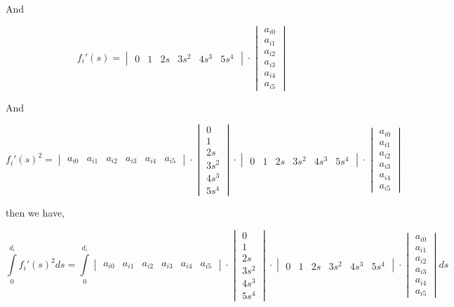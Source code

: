 \documentclass[a4paper,11pt]{article}  %
\begin{document}
And

$$
f_i'(s) =
\begin{vmatrix} 0 & 1 & 2s & 3s^2 & 4s^3 & 5s^4 \end{vmatrix}
\cdot
\begin{vmatrix} a_{i0} \\ a_{i1} \\ a_{i2} \\ a_{i3} \\ a_{i4} \\ a_{i5} \end{vmatrix}   
$$



And 

$$
f_i'(s)^2 =
\begin{vmatrix} a_{i0} & a_{i1} & a_{i2} & a_{i3} & a_{i4} & a_{i5}  \end{vmatrix} 
\cdot 
\begin{vmatrix} 0 \\ 1 \\ 2s \\ 3s^2 \\ 4s^3 \\ 5s^4 \end{vmatrix} 
\cdot 
\begin{vmatrix} 0 & 1 & 2s & 3s^2 & 4s^3 & 5s^4 \end{vmatrix} 
\cdot 
\begin{vmatrix} a_{i0} \\ a_{i1} \\ a_{i2} \\ a_{i3} \\ a_{i4} \\ a_{i5}  \end{vmatrix}
$$

then we have,

$$
\int\limits_{0}^{d_i} f_i'(s)^2 ds =
\int\limits_{0}^{d_i}
\begin{vmatrix} a_{i0} & a_{i1} & a_{i2} & a_{i3} & a_{i4} & a_{i5} \end{vmatrix} 
\cdot  
\begin{vmatrix} 0 \\ 1 \\ 2s \\ 3s^2 \\ 4s^3 \\ 5s^4 \end{vmatrix} 
\cdot 
\begin{vmatrix} 0 & 1 & 2s & 3s^2 & 4s^3 & 5s^4 \end{vmatrix} 
\cdot 
\begin{vmatrix} a_{i0} \\ a_{i1} \\ a_{i2} \\ a_{i3} \\ a_{i4} \\ a_{i5}  \end{vmatrix} ds
$$
\end{document}
